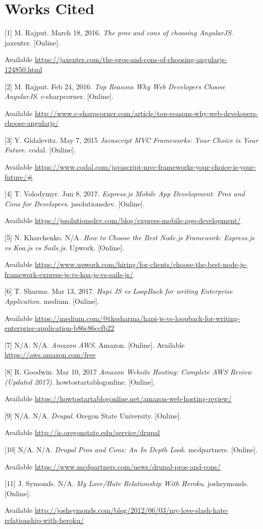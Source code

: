 \documentclass[onecolumn, draftclsnofoot,10pt, compsoc]{IEEEtran}
\begin{document}
\pagebreak
	
\section{Works Cited} 



[1] M. Rajput. March 18, 2016. \textit{The pros and cons of choosing AngularJS}. jaxenter. [Online]. 

Available \url{https://jaxenter.com/the-pros-and-cons-of-choosing-angularjs-124850.html}

[2] M. Rajput. Feb 24, 2016. \textit{Top Reasons Why Web Developers Choose AngularJS}. c-sharpcorner. [Online]. 

Available \url{http://www.c-sharpcorner.com/article/top-reasons-why-web-developers-choose-angularjs/}

[3] Y. Gidalevitz. May 7, 2015 \textit{Javascript MVC Frameworks: Your Choice is Your Future}. codal. [Online].  

Available \url{https://www.codal.com/javascript-mvc-frameworks-your-choice-is-your-future/#}

[4] T. Volodymyr. Jun 8, 2017. \textit{Express.js Mobile App Development: Pros and Cons for Developers}. jssolutionsdev. [Online].  

Available \url{https://jssolutionsdev.com/blog/express-mobile-app-development/}

[5] N. Kharchenko. N/A. \textit{How to Choose the Best Node.js Framework: Express.js vs Koa.js vs Sails.js}. Upwork. [Online]. 

Available \url{https://www.upwork.com/hiring/for-clients/choose-the-best-node-js-framework-express-js-vs-koa-js-vs-sails-js/}

[6] T. Sharma. Mar 13, 2017. \textit{Hapi JS vs LoopBack for writing Enterprise Application}. medium. [Online]. 

Available \url{https://medium.com/@tkssharma/hapi-js-vs-loopback-for-writing-enterprise-application-b86c86ccfb22}

[7] N/A. N/A. \textit{Amazon AWS}. Amazon. [Online]. Available \url{https://aws.amazon.com/free}

[8] R. Goodwin. Mar 10, 2017 \textit{Amazon Website Hosting: Complete AWS Review (Updated 2017)}. howtostartablogonline. [Online]. 

Available \url{https://howtostartablogonline.net/amazon-web-hosting-review/}

[9] N/A. N/A. \textit{ Drupal}. Oregon State University. [Online]. 

Available \url{http://is.oregonstate.edu/service/drupal}

[10] N/A. N/A. \textit{Drupal Pros and Cons: An In Depth Look}. mcdpartners. [Online]. 

Available \url{https://www.mcdpartners.com/news/drupal-pros-and-cons/}

[11] J. Symonds. N/A. \textit{My Love/Hate Relationship With Heroku}. joshsymonds. [Online]. 

Available \url{http://joshsymonds.com/blog/2012/06/03/my-love-slash-hate-relationship-with-heroku/}
\end{document}
